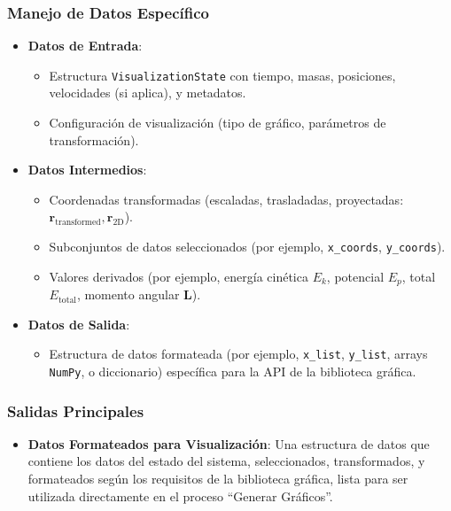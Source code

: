 \subsubsection{Manejo de Datos Específico}
\begin{itemize}
    \item \textbf{Datos de Entrada}:
    \begin{itemize}
        \item Estructura \texttt{VisualizationState} con tiempo, masas, posiciones, velocidades (si aplica), y metadatos.
        \item Configuración de visualización (tipo de gráfico, parámetros de transformación).
    \end{itemize}
    \item \textbf{Datos Intermedios}:
    \begin{itemize}
        \item Coordenadas transformadas (escaladas, trasladadas, proyectadas: $\mathbf{r}_{\text{transformed}}, \mathbf{r}_{\text{2D}}$).
        \item Subconjuntos de datos seleccionados (por ejemplo, \texttt{x\_coords}, \texttt{y\_coords}).
        \item Valores derivados (por ejemplo, energía cinética $E_k$, potencial $E_p$, total $E_{\text{total}}$, momento angular $\mathbf{L}$).
    \end{itemize}
    \item \textbf{Datos de Salida}:
    \begin{itemize}
        \item Estructura de datos formateada (por ejemplo, \texttt{x\_list}, \texttt{y\_list}, arrays \texttt{NumPy}, o diccionario) específica para la API de la biblioteca gráfica.
    \end{itemize}
\end{itemize}

\subsubsection{Salidas Principales}
\begin{itemize}
    \item \textbf{Datos Formateados para Visualización}: Una estructura de datos que contiene los datos del estado del sistema, seleccionados, transformados, y formateados según los requisitos de la biblioteca gráfica, lista para ser utilizada directamente en el proceso ``Generar Gráficos''.
\end{itemize}

